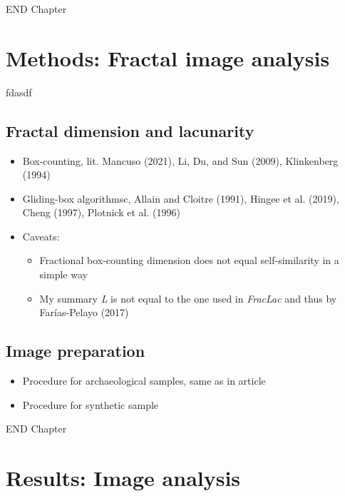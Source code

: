 \documentclass[
  12pt,
]{book}
\begin{document}
END Chapter

\hypertarget{images-methods}{%
\chapter{Methods: Fractal image analysis}\label{images-methods}}

fdasdf

\hypertarget{fractal-dimension-and-lacunarity}{%
\section{Fractal dimension and lacunarity}\label{fractal-dimension-and-lacunarity}}

\begin{itemize}
\item
  Box-counting, lit. Mancuso (2021), Li, Du, and Sun (2009), Klinkenberg (1994)
\item
  Gliding-box algorithmsc, Allain and Cloitre (1991), Hingee et al. (2019), Cheng (1997), Plotnick et al. (1996)
\item
  Caveats:

  \begin{itemize}
  \item
    Fractional box-counting dimension does not equal self-similarity in a simple way
  \item
    My summary \emph{L} is not equal to the one used in \emph{FracLac} and thus by Farías-Pelayo (2017)
  \end{itemize}
\end{itemize}

\hypertarget{image-preparation}{%
\section{Image preparation}\label{image-preparation}}

\begin{itemize}
\item
  Procedure for archaeological samples, same as in article
\item
  Procedure for synthetic sample
\end{itemize}

END Chapter

\hypertarget{images-results}{%
\chapter{Results: Image analysis}\label{images-results}}
\end{document}
